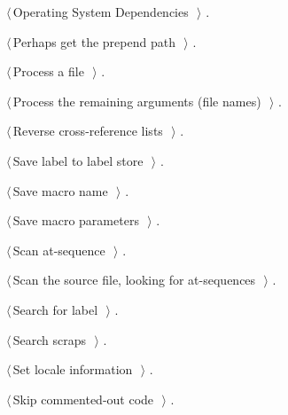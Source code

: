 \documentclass{report}
\begin{document}
{\begin{list}{}{\setlength{\itemsep}{-\parsep}\setlength{\itemindent}{-\leftmargin}}
\item $\langle\,$Operating System Dependencies\nobreak\ {\footnotesize {}}$\,\rangle$ {\footnotesize {\NWtxtRefIn} .
}
\item $\langle\,$Perhaps get the prepend path\nobreak\ {\footnotesize {}}$\,\rangle$ {\footnotesize {\NWtxtRefIn} .}
\item $\langle\,$Process a file\nobreak\ {\footnotesize {}}$\,\rangle$ {\footnotesize {\NWtxtRefIn} .}
\item $\langle\,$Process the remaining arguments (file names)\nobreak\ {\footnotesize {}}$\,\rangle$ {\footnotesize {\NWtxtRefIn} .}
\item $\langle\,$Reverse cross-reference lists\nobreak\ {\footnotesize {}}$\,\rangle$ {\footnotesize {\NWtxtRefIn} .}
\item $\langle\,$Save label to label store\nobreak\ {\footnotesize {}}$\,\rangle$ {\footnotesize {\NWtxtRefIn} .}
\item $\langle\,$Save macro name\nobreak\ {\footnotesize {}}$\,\rangle$ {\footnotesize {\NWtxtRefIn} .}
\item $\langle\,$Save macro parameters\nobreak\ {\footnotesize {}}$\,\rangle$ {\footnotesize {\NWtxtRefIn} .}
\item $\langle\,$Scan at-sequence\nobreak\ {\footnotesize {}}$\,\rangle$ {\footnotesize {\NWtxtRefIn} .}
\item $\langle\,$Scan the source file, looking for at-sequences\nobreak\ {\footnotesize {}}$\,\rangle$ {\footnotesize {\NWtxtRefIn} .}
\item $\langle\,$Search for label\nobreak\ {\footnotesize {}}$\,\rangle$ {\footnotesize {\NWtxtRefIn} .
}
\item $\langle\,$Search scraps\nobreak\ {\footnotesize {}}$\,\rangle$ {\footnotesize {\NWtxtRefIn} .}
\item $\langle\,$Set locale information\nobreak\ {\footnotesize {}}$\,\rangle$ {\footnotesize {\NWtxtRefIn} .}
\item $\langle\,$Skip commented-out code\nobreak\ {\footnotesize {}}$\,\rangle$ {\footnotesize {\NWtxtRefIn} .
}
\end{list}}
\end{document}
